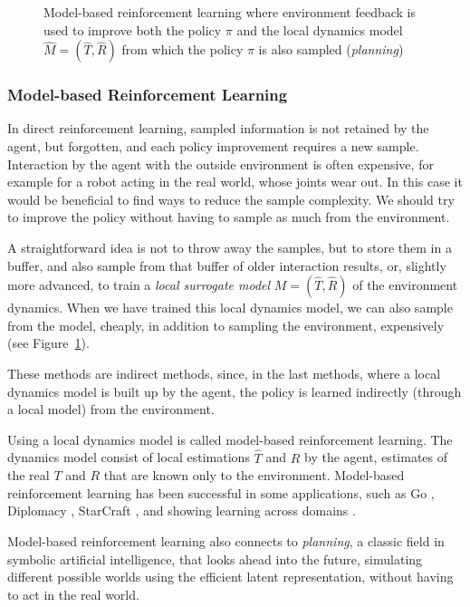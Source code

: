 \begin{figure}[ht]
  \begin{center}
    
    \caption{Model-based reinforcement learning where environment feedback is used to improve both the policy $\pi$ and the local dynamics model $\hat{M}=(\hat{T},\hat{R})$ from which the policy $\pi$ is also sampled ({\em planning})}\label{fig:mbrl}
  \end{center}
\end{figure}

\subsubsection{Model-based Reinforcement Learning}
In direct reinforcement learning, sampled information is not retained by the agent, but forgotten, and each policy improvement requires a new sample.  Interaction by the agent with the outside environment is often expensive, for example for a robot acting in the real world, whose joints wear out. In this case it would be beneficial to find ways to reduce the sample complexity. We should try to improve the policy without having to sample as much from the environment. 

A straightforward idea is not to throw away the samples, but to store them in a buffer, and also sample from that buffer of older interaction results, or, slightly more advanced,  to train a {\em local surrogate model} $M=(\hat{T}, \hat{R})$ of the environment dynamics. When we have trained this local dynamics model, we can also sample from the model, cheaply, in addition to sampling the environment, expensively (see Figure~\ref{fig:mbrl}). 

These methods are indirect methods, since, in the last methods, where a local dynamics model is built up by the agent, the policy is learned indirectly (through a local model) from the environment. 

Using a local dynamics model is called model-based reinforcement learning. The dynamics model consist of local estimations  $\hat{T}$ and $\hat{R}$ by the agent, estimates of the real $T$ and $R$ that are known only to the environment. 
Model-based reinforcement learning has been successful in some applications, such as Go \citep{silver2016mastering}, Diplomacy \citep{meta2022human}, StarCraft \citep{vinyals2019grandmaster}, and showing learning across domains \citep{hafner2020mastering}. 


Model-based reinforcement learning  also connects to {\em planning}, a classic field in symbolic artificial intelligence, that looks ahead into the future, simulating different possible worlds using the efficient latent representation, without having to act in the real world. 

